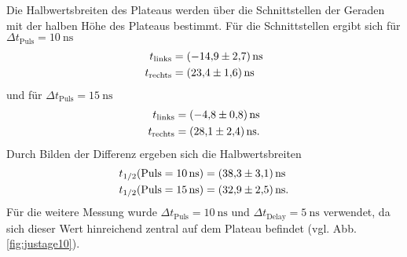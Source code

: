 \noindent
Die Halbwertsbreiten des Plateaus werden über die Schnittstellen der Geraden mit der halben Höhe des Plateaus
bestimmt. Für die Schnittstellen ergibt sich für $\Delta t_{\text{Puls}}=\SI{10}{\nano\second}$
\begin{align*}
  t_\text{links} &=\SI{-14.9\pm 2.7}{\nano\second}\\
  t_\text{rechts}&=\SI{23.4\pm 1.6}{\nano\second}
\end{align*}
und für $\Delta t_{\text{Puls}}=\SI{15}{\nano\second}$
\begin{align*}
  t_\text{links} &=\SI{-4.8\pm 0.8}{\nano\second}\\
  t_\text{rechts}&=\SI{28.1\pm 2.4}{\nano\second}.
\end{align*}
Durch Bilden der Differenz ergeben sich die Halbwertsbreiten
\begin{align*}
  t_{1/2}(\text{Puls}=\SI{10}{\nano\second})&=\SI{38.3\pm 3.1}{\nano\second}\\
  t_{1/2}(\text{Puls}=\SI{15}{\nano\second})&=\SI{32.9\pm 2.5}{\nano\second}.
\end{align*}
Für die weitere Messung wurde $\Delta t_{\text{Puls}}=\SI{10}{\nano\second}$ und $\Delta t_{\text{Delay}}=\SI{5}{\nano\second}$ verwendet, da sich dieser Wert hinreichend zentral
auf dem Plateau befindet (vgl. Abb.\ref{fig:justage10}).

